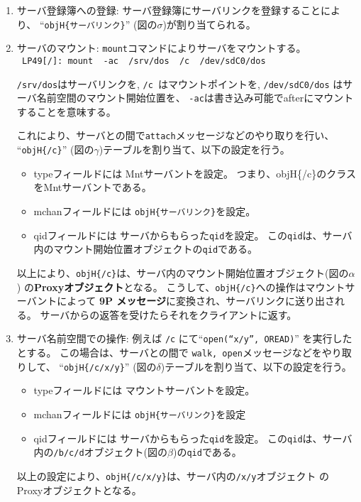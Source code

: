 \begin{enumerate}
\item サーバ登録簿への登録:  
  サーバ登録簿にサーバリンクを登録することにより、
  ``{\tt objH\{サーバリンク\}}'' (図の$\sigma$)が割り当てられる。

\item サーバのマウント: 
   {\tt mount}コマンドによりサーバをマウントする。\\
   \verb| LP49[/]: mount  -ac  /srv/dos  /c  /dev/sdC0/dos|

   {\tt /srv/dos}はサーバリンクを,
   {\tt /c }はマウントポイントを,
   {\tt /dev/sdC0/dos} はサーバ名前空間のマウント開始位置を、
   {\tt -ac}は書き込み可能でafterにマウントすることを意味する。  

  これにより、サーバとの間で{\tt attach}メッセージなどのやり取りを行い、
  ``{\tt objH\{/c\}}'' (図の$\gamma$)テーブルを割り当て、以下の設定を行う。
  \begin{itemize}
    \item  typeフィールドには Mntサーバントを設定。
          つまり、objH\{/c\}のクラスをMntサーバントである。
    \item  mchanフィールドには {\tt objH\{サーバリンク\}}を設定。
    \item  qidフィールドには サーバからもらった{\tt qid}を設定。
          この{\tt qid}は、サーバ内のマウント開始位置オブジェクトの{\tt qid}である。
  \end{itemize}
  
    以上により、{\tt objH\{/c\}}は、サーバ内のマウント開始位置オブジェクト(図の$\alpha$)
    の{\bf Proxyオブジェクト}となる。
    こうして、{\tt objH\{/c\}}への操作はマウントサーバントによって
    {\bf 9P メッセージ}に変換され、サーバリンクに送り出される。
   サーバからの返答を受けたらそれをクライアントに返す。

\item サーバ名前空間での操作:  
   例えば {\tt /c} にて``{\tt open(``x/y'', OREAD)}'' を実行したとする。
   この場合は、サーバとの間で {\tt walk, open}メッセージなどをやり取りして、
   ``{\tt objH\{/c/x/y\}}'' (図の$\delta$)テーブルを割り当て、以下の設定を行う。
  \begin{itemize}
    \item  typeフィールドには マウントサーバントを設定。
    \item  mchanフィールドには {\tt objH\{サーバリンク\}}を設定
    \item  qidフィールドには サーバからもらった{\tt qid}を設定。
       この{\tt qid}は、サーバ内の{\tt /b/c/d}オブジェクト(図の$\beta$)の{\tt qid}である。
  \end{itemize}

    以上の設定により、{\tt objH\{/c/x/y\}}は、サーバ内の{\tt /x/y}オブジェクト
    の Proxyオブジェクトとなる。

\end{enumerate}








